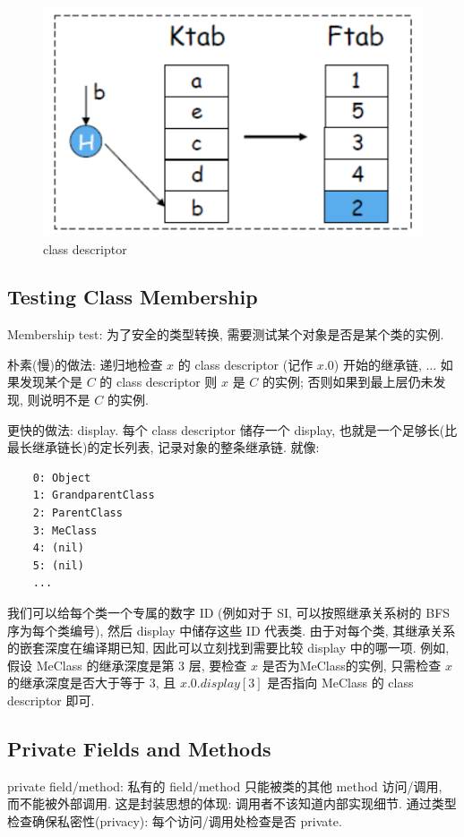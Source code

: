 \begin{figure}[H]
    \centering
    \includegraphics[width=0.4\linewidth]{pic/CP14/class descriptor}
    \caption{class descriptor}
\end{figure}

\subsection{Testing Class Membership}
Membership test: 为了安全的类型转换, 需要测试某个对象是否是某个类的实例. 

朴素(慢)的做法: 递归地检查 $x$ 的 class descriptor (记作 $x.0$) 开始的继承链, $\dots$ 如果发现某个是 $C$ 的 class descriptor 则 $x$ 是 $C$ 的实例; 否则如果到最上层仍未发现, 则说明不是 $C$ 的实例. 


更快的做法: display. 每个 class descriptor 储存一个 display, 也就是一个足够长(比最长继承链长)的定长列表, 记录对象的整条继承链. 就像: 
\begin{verbatim}
    0: Object
    1: GrandparentClass
    2: ParentClass
    3: MeClass
    4: (nil)
    5: (nil)
    ...
\end{verbatim}
我们可以给每个类一个专属的数字 ID (例如对于 SI, 可以按照继承关系树的 BFS 序为每个类编号), 然后 display 中储存这些 ID 代表类. 由于对每个类, 其继承关系的嵌套深度在编译期已知, 因此可以立刻找到需要比较 display 中的哪一项. 例如, 假设 MeClass 的继承深度是第 3 层, 要检查 $x$ 是否为MeClass的实例, 只需检查 $x$ 的继承深度是否大于等于 3, 且 $x.0.display[3]$ 是否指向 MeClass 的 class descriptor 即可. 

\subsection{Private Fields and Methods}
private field/method: 私有的 field/method 只能被类的其他 method 访问/调用, 而不能被外部调用. 这是封装思想的体现: 调用者不该知道内部实现细节. 通过类型检查确保私密性(privacy): 每个访问/调用处检查是否 private.


